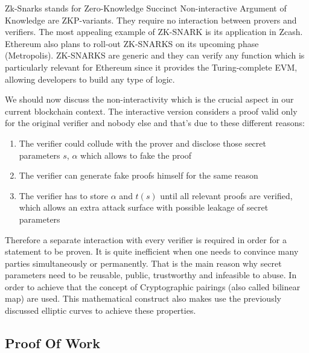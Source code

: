 \documentclass{article}
\begin{document}
Zk-Snarks stands for Zero-Knowledge Succinct Non-interactive Argument of Knowledge are ZKP-variants. They require no interaction between provers and verifiers. The most appealing example of ZK-SNARK is its application in Zcash. Ethereum also plans to roll-out ZK-SNARKS on its upcoming phase (Metropolis). ZK-SNARKS are generic and they can verify any function which is particularly relevant for Ethereum since it provides the Turing-complete EVM, allowing developers to build any type of logic.

We should now discuss the non-interactivity which is the crucial aspect in our current blockchain context. The interactive version considers a proof valid only for the original verifier and nobody else and that's due to these different reasons:

\begin{enumerate}
    \item The verifier could collude with the prover and disclose those secret parameters $s$, $α$ which allows to fake the proof
    \item The verifier can generate fake proofs himself for the same reason
    \item The verifier has to store $α$ and $t(s)$ until all relevant proofs are verified, which allows an extra attack surface with possible leakage of secret parameters
\end{enumerate}

Therefore a separate interaction with every verifier is required in order for a statement to be proven. It is quite inefficient when one needs to convince many parties simultaneously or permanently. That is the main reason why secret parameters need to be reusable, public, trustworthy and infeasible to abuse. In order to achieve that the concept of Cryptographic pairings (also called bilinear map) are used. This mathematical construct also makes use the previously discussed elliptic curves to achieve these properties.








\subsection{Proof Of Work}
\end{document}
